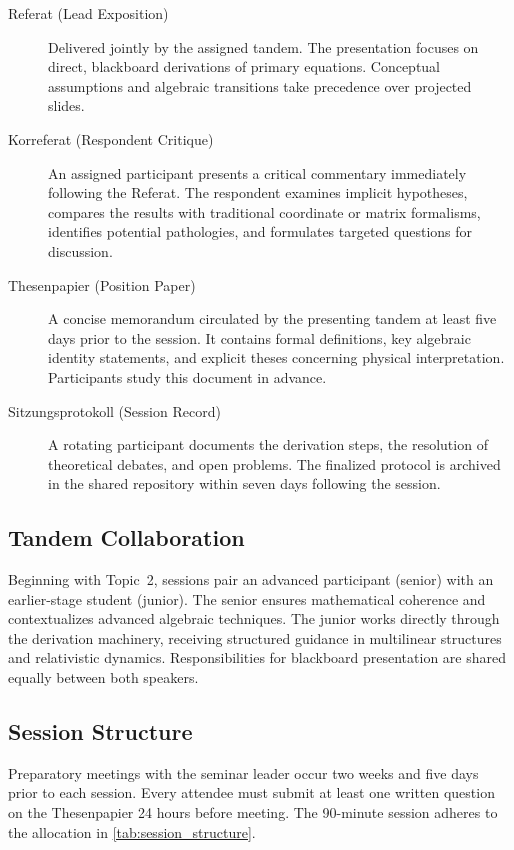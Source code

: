 \documentclass[11pt,a4paper]{article}
\begin{document}
\begin{description}
  \item[Referat (Lead Exposition)]
  Delivered jointly by the assigned tandem.
  The presentation focuses on direct, blackboard derivations of primary
  equations.
  Conceptual assumptions and algebraic transitions take precedence over
  projected slides.
  \item[Korreferat (Respondent Critique)]
  An assigned participant presents a critical commentary immediately following
  the Referat.
  The respondent examines implicit hypotheses, compares the results with
  traditional coordinate or matrix formalisms, identifies potential pathologies,
  and formulates targeted questions for discussion.
  \item[Thesenpapier (Position Paper)]
  A concise memorandum circulated by the presenting tandem at least five days
  prior to the session.
  It contains formal definitions, key algebraic identity statements, and
  explicit theses concerning physical interpretation.
  Participants study this document in advance.
  \item[Sitzungsprotokoll (Session Record)]
  A rotating participant documents the derivation steps, the resolution of
  theoretical debates, and open problems.
  The finalized protocol is archived in the shared repository within seven days
  following the session.
\end{description}

\subsection{Tandem Collaboration}
\label{subsec:tandems}

Beginning with Topic~2, sessions pair an advanced participant (senior) with an
earlier-stage student (junior).
The senior ensures mathematical coherence and contextualizes advanced algebraic
techniques.
The junior works directly through the derivation machinery, receiving structured
guidance in multilinear structures and relativistic dynamics.
Responsibilities for blackboard presentation are shared equally between both
speakers.

\subsection{Session Structure}
\label{subsec:structure}

Preparatory meetings with the seminar leader occur two weeks and five days prior
to each session.
Every attendee must submit at least one written question on the Thesenpapier 24
hours before meeting.
The 90-minute session adheres to the allocation in \cref{tab:session_structure}.
\end{document}
